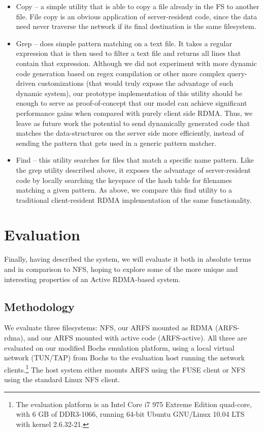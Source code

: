 \documentclass[10pt]{article}
\begin{document}
\begin{itemize}
\item Copy -- a simple utility that is able to copy a file already in
  the FS to another file. File copy is an obvious application of
  server-resident code, since the data need never traverse the network
  if its final destination is the same filesystem.

\item Grep -- does simple pattern matching on a text file. It takes a
  regular expression that is then used to filter a text file and
  returns all lines that contain that expression. Although we did not
  experiment with more dynamic code generation based on regex
  compilation or other more complex query-driven customizations (that
  would truly expose the advantage of such dynamic system), our
  prototype implementation of this utility should be enough to serve
  as proof-of-concept that our model can achieve significant
  performance gains when compared with purely client side RDMA. Thus,
  we leave as future work the potential to send dynamically generated
  code that matches the data-structures on the server side more
  efficiently, instead of sending the pattern that gets used in a
  generic pattern matcher.

\item Find -- this utility searches for files that match a specific
  name pattern. Like the grep utility described above, it exposes the
  advantage of server-resident code by locally searching the keyspace
  of the hash table for filenames matching a given pattern. As above,
  we compare this find utility to a traditional client-resident RDMA
  implementation of the same functionality.

\end{itemize}

\section{Evaluation}

Finally, having described the system, we will evaluate it both in
absolute terms and in comparison to NFS, hoping to explore some of the
more unique and interesting properties of an Active RDMA-based system.

\subsection{Methodology}

We evaluate three filesystems: NFS, our ARFS mounted as RDMA
(ARFS-rdma), and our ARFS mounted with active code (ARFS-active). All
three are evaluated on our modified Bochs emulation platform, using a
local virtual network (TUN/TAP) from Bochs to the evaluation host
running the network clients.\footnote{The evaluation platform is an
  Intel Core i7 975 Extreme Edition quad-core, with 6 GB of DDR3-1066,
  running 64-bit Ubuntu GNU/Linux 10.04 LTS with kernel 2.6.32-21.}
The host system either mounts ARFS using the FUSE client or NFS using
the standard Linux NFS client.
\end{document}
